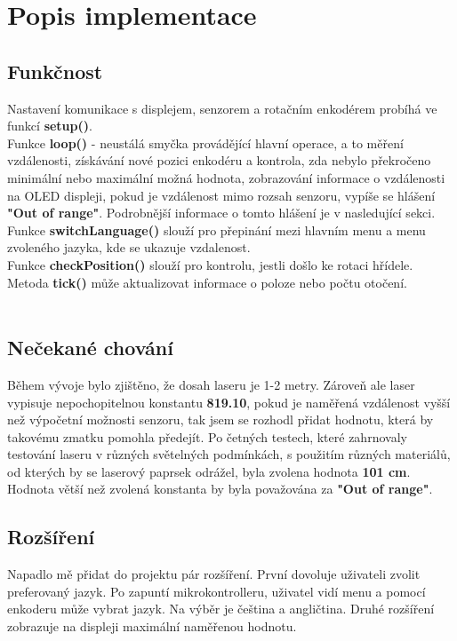 \graphicspath{{Images/}}
\hypersetup{linkcolor=blue, urlcolor=blue}

\section{Popis implementace}

\begin{spacing}{1.5}
    \subsection{Funkčnost}
    \fontsize{14}{14}\selectfont
    Nastavení komunikace s displejem, senzorem a rotačním enkodérem probíhá ve funkcí \textbf{setup()}.
    \\
    Funkce \textbf{loop()} - neustálá smyčka provádějící hlavní operace, a to měření vzdálenosti, získávání nové pozici enkodéru a kontrola, zda nebylo překročeno minimální nebo maximální možná hodnota, zobrazování informace o vzdálenosti na OLED displeji, pokud je vzdálenost mimo rozsah senzoru, vypíše se hlášení \textbf{"Out of range"}. Podrobnější informace o tomto hlášení je v nasledující sekci.
    \\
    Funkce \textbf{switchLanguage()} slouží pro přepinání mezi hlavním menu a menu zvoleného jazyka, kde se ukazuje vzdalenost.
    \\
    Funkce \textbf{checkPosition()} slouží pro kontrolu, jestli došlo ke rotaci hřídele. Metoda \textbf{tick()} může aktualizovat informace o poloze nebo počtu otočení.
    \\
    \\
    \subsection{Nečekané chování}
    \fontsize{14}{14}\selectfont
    Během vývoje bylo zjištěno, že dosah laseru je 1-2 metry. Zároveň ale laser vypisuje nepochopitelnou konstantu \textbf{819.10}, pokud je naměřená vzdálenost vyšší než výpočetní možnosti senzoru, tak jsem se rozhodl přidat hodnotu, která by takovému zmatku pomohla předejít. Po četných testech, které zahrnovaly testování laseru v různých světelných podmínkách, s použitím různých materiálů, od kterých by se laserový paprsek odrážel, byla zvolena hodnota \textbf{101 cm}. Hodnota větší než zvolená konstanta by byla považována za \textbf{"Out of range"}.
    \\
    \subsection{Rozšíření}
    \fontsize{14}{14}\selectfont
    Napadlo mě přidat do projektu pár rozšíření. První dovoluje uživateli zvolit preferovaný jazyk. Po zapuntí mikrokontrolleru, uživatel vidí menu a pomocí enkoderu může vybrat jazyk. Na výběr je čeština a angličtina. Druhé rozšíření zobrazuje na displeji maximální naměřenou hodnotu.
    
\end{spacing}